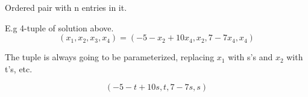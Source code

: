 	\begin{definition}[n-tuple]
		Ordered pair with n entries in it.

		E.g 4-tuple of solution above.
		\[(x_1,x_2,x_3,x_4) = (-5-x_2+10x_4, x_2, 7-7x_4, x_4)\]
	\end{definition}

	The tuple is always going to be parameterized, replacing $x_1$ with s's and $x_2$ with t's, etc.

		\[(-5-t+10s, t, 7-7s, s)\]





\newpage


